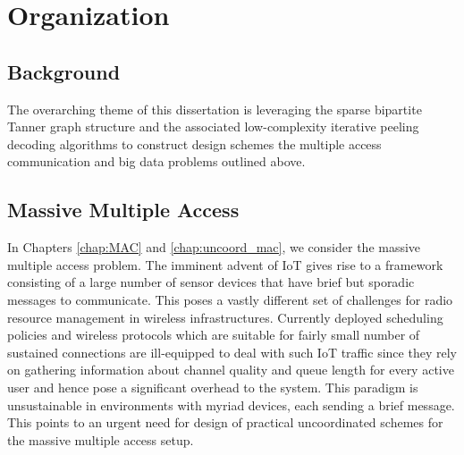 \section{Organization}

\subsection*{Background}
The overarching theme of this dissertation is leveraging the sparse bipartite Tanner graph structure and the associated low-complexity iterative peeling decoding algorithms to construct design schemes the multiple access communication and big data problems outlined above. %


\subsection*{Massive Multiple Access}
In Chapters \ref{chap:MAC} and \ref{chap:uncoord_mac}, we consider the massive multiple access problem.  The imminent advent of IoT gives rise to a framework consisting of a large number of sensor devices that have brief but sporadic messages to communicate. This poses a vastly different set of challenges for radio resource management in wireless infrastructures. Currently deployed scheduling policies and wireless protocols which are suitable for fairly small number of sustained connections are ill-equipped to deal with such IoT traffic since they rely on gathering information about channel quality and queue length for every active user and hence pose a significant overhead to the system. This paradigm is unsustainable in environments with myriad devices, each sending a brief message.  This points to an urgent need for design of practical uncoordinated schemes for the massive multiple access setup. 

